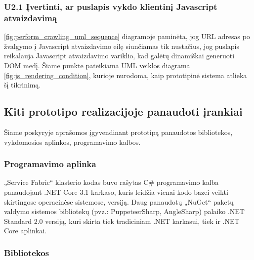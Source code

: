 

\subsubsection{U2.1 Įvertinti, ar puslapis vykdo klientinį Javascript atvaizdavimą}

\ref{fig:perform_crawling_uml_sequence} diagramoje paminėta, jog URL adresas po žvalgymo į Javascript atvaizdavimo eilę siunčiamas tik nustačius, jog puslapis reikalauja Javascript atvaizdavimo variklio, kad galėtų dinamiškai generuoti DOM medį. Šiame punkte pateikiama UML veiklos diagrama \ref{fig:js_rendering_condition}, kurioje nurodoma, kaip prototipinė sistema atlieka šį tikrinimą.



\pagebreak

\subsection{Kiti prototipo realizacijoje panaudoti įrankiai}

Šiame poskyryje aprašomos įgyvendinant prototipą panaudotos bibliotekos, vykdomosios aplinkos, programavimo kalbos.

\subsubsection{Programavimo aplinka}

„Service Fabric“ klasterio kodas buvo rašytas C\# programavimo kalba panaudojant .NET Core 3.1 karkaso, kuris leidžia vienai kodo bazei veikti skirtingose operacinėse sistemose, versiją. Daug panaudotų „NuGet“ paketų valdymo sistemos bibliotekų (pvz.: PuppeteerSharp, AngleSharp) palaiko .NET Standard 2.0 versiją, kuri skirta tiek tradiciniam .NET karkasui, tiek ir .NET Core aplinkai.

\subsubsection{Bibliotekos}

